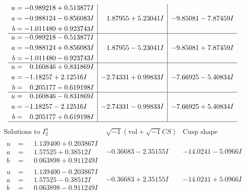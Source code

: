 \documentclass[1p]{elsarticle_modified}
\theoremstyle{definition}
\newcommand{\I}{\sqrt{-1}}
\begin{document}
$$\begin{array}{c|c|c}
\begin{aligned}
u &= -0.989218 + 0.513877 I \\
a &= -0.988124 - 0.856083 I \\
b &= -1.011480 + 0.923743 I\end{aligned}
 & \phantom{-}1.87955 + 5.23041 I & -9.85081 - 7.87459 I \\ \hline\begin{aligned}
u &= -0.989218 - 0.513877 I \\
a &= -0.988124 + 0.856083 I \\
b &= -1.011480 - 0.923743 I\end{aligned}
 & \phantom{-}1.87955 - 5.23041 I & -9.85081 + 7.87459 I \\ \hline\begin{aligned}
u &= \phantom{-}0.160846 + 0.831869 I \\
a &= -1.18257 + 2.12516 I \\
b &= \phantom{-}0.205177 - 0.619198 I\end{aligned}
 & -2.74331 + 0.99833 I & -7.66925 - 5.40834 I \\ \hline\begin{aligned}
u &= \phantom{-}0.160846 - 0.831869 I \\
a &= -1.18257 - 2.12516 I \\
b &= \phantom{-}0.205177 + 0.619198 I\end{aligned}
 & -2.74331 - 0.99833 I & -7.66925 + 5.40834 I\\
 \hline 
 \end{array}$$\newpage$$\begin{array}{c|c|c}  
\text{Solutions to }I^u_{2}& \I (\text{vol} + \sqrt{-1}CS) & \text{Cusp shape}\\
 \hline 
\begin{aligned}
u &= \phantom{-}1.139400 + 0.203867 I \\
a &= \phantom{-}1.57525 + 0.38512 I \\
b &= \phantom{-}0.063898 + 0.911249 I\end{aligned}
 & -0.36683 - 2.35155 I & -14.0241 - 5.0966 I \\ \hline\begin{aligned}
u &= \phantom{-}1.139400 - 0.203867 I \\
a &= \phantom{-}1.57525 - 0.38512 I \\
b &= \phantom{-}0.063898 - 0.911249 I\end{aligned}
 & -0.36683 + 2.35155 I & -14.0241 + 5.0966 I \\ \hline\begin{aligned}

\end{aligned}
\end{array}$$
\end{document}
